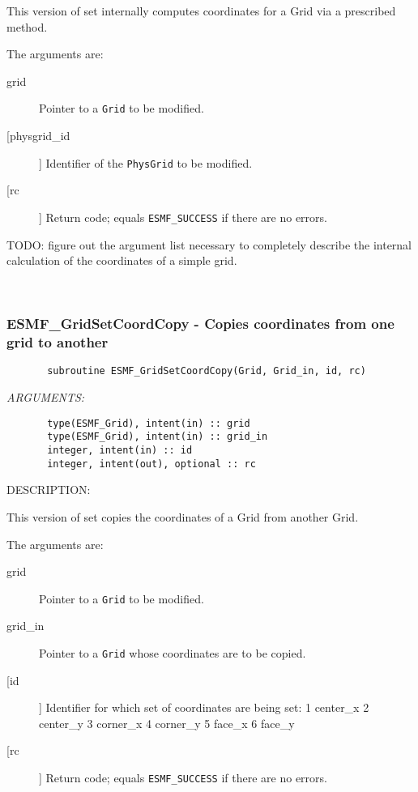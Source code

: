        This version of set internally computes coordinates for a Grid via a
       prescribed method.
  
       The arguments are:
       \begin{description}
       \item[grid]
            Pointer to a {\tt Grid} to be modified.
       \item[[physgrid\_id]]
            Identifier of the {\tt PhysGrid} to be modified.
       \item[[rc]]
            Return code; equals {\tt ESMF\_SUCCESS} if there are no errors.
       \end{description}
  
  TODO: figure out the argument list necessary to completely describe the
        internal calculation of the coordinates of a simple grid. 
 
\mbox{}\hrulefill\ 
 
\subsubsection{ESMF\_GridSetCoordCopy - Copies coordinates from one grid to another}


 
\begin{verbatim}       subroutine ESMF_GridSetCoordCopy(Grid, Grid_in, id, rc)\end{verbatim}{\em ARGUMENTS:}
\begin{verbatim}       type(ESMF_Grid), intent(in) :: grid
       type(ESMF_Grid), intent(in) :: grid_in
       integer, intent(in) :: id
       integer, intent(out), optional :: rc\end{verbatim}
{\sf DESCRIPTION:\\ }


       This version of set copies the coordinates of a Grid from another Grid.
  
       The arguments are:
       \begin{description}
       \item[grid]
            Pointer to a {\tt Grid} to be modified.
       \item[grid\_in]
            Pointer to a {\tt Grid} whose coordinates are to be copied.
       \item[[id]]
            Identifier for which set of coordinates are being set:
               1  center\_x
               2  center\_y
               3  corner\_x
               4  corner\_y
               5  face\_x
               6  face\_y 
       \item[[rc]]
            Return code; equals {\tt ESMF\_SUCCESS} if there are no errors.
       \end{description}
   
